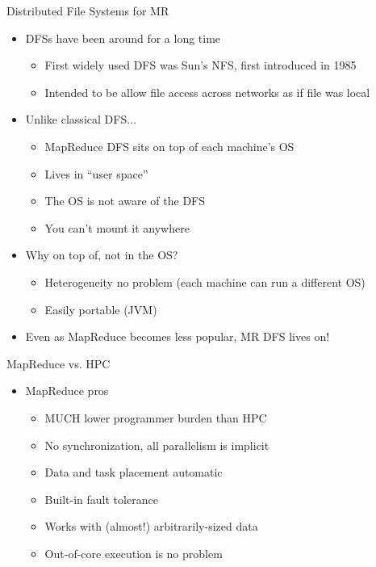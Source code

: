 \documentclass[aspectratio=169]{beamer}
\begin{document}
\begin{frame}{Distributed File Systems for MR}

\begin{itemize}
\item DFSs have been around for a long time
        \begin{itemize}
        \item First widely used DFS was Sun's NFS, first introduced in 1985
        \item Intended to be allow file access across networks as if file was local
        \end{itemize}
\item Unlike classical DFS...
        \begin{itemize}
	\item MapReduce DFS sits on top of each machine's OS
        \item Lives in ``user space''
        \item The OS is not aware of the DFS
        \item You can't mount it anywhere
        \end{itemize}
\item Why on top of, not in the OS?
	\begin{itemize}
	\item Heterogeneity no problem (each machine can run a different OS)
	\item Easily portable (JVM)
	\end{itemize}
\item Even as MapReduce becomes less popular, MR DFS lives on!
\end{itemize}
\end{frame}
\begin{frame}{MapReduce vs. HPC}

\begin{itemize}
\item MapReduce pros
	\begin{itemize}
	\item MUCH lower programmer burden than HPC
	\item No synchronization, all parallelism is implicit
	\item Data and task placement automatic
	\item Built-in fault tolerance
	\item Works with (almost!) arbitrarily-sized data
	\item Out-of-core execution is no problem
	\end{itemize}
\end{itemize}
\end{frame}
\end{document}
